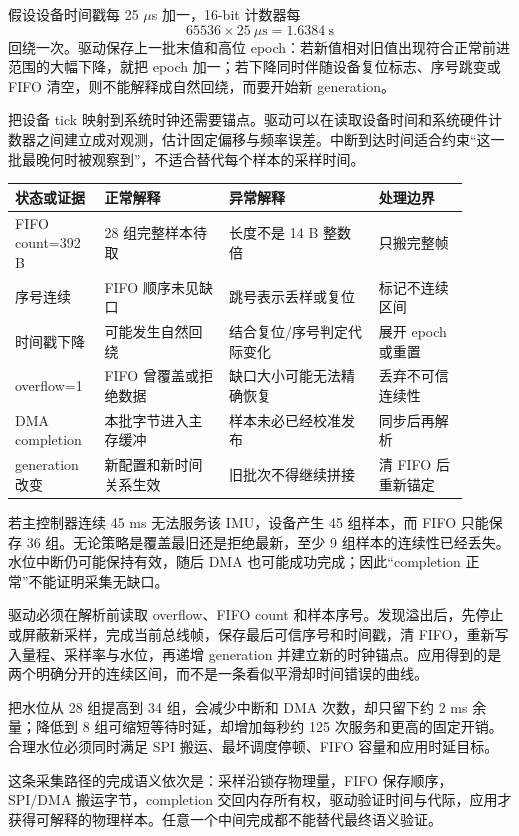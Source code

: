 
假设设备时间戳每 25 $\mu$s 加一，16-bit 计数器每
\[
65536\times25\ \mu\text{s}=1.6384\ \text{s}
\]
回绕一次。驱动保存上一批末值和高位 epoch：若新值相对旧值出现符合正常前进范围的大幅下降，就把 epoch 加一；若下降同时伴随设备复位标志、序号跳变或 FIFO 清空，则不能解释成自然回绕，而要开始新 generation。

把设备 tick 映射到系统时钟还需要锚点。驱动可以在读取设备时间和系统硬件计数器之间建立成对观测，估计固定偏移与频率误差。中断到达时间适合约束“这一批最晚何时被观察到”，不适合替代每个样本的采样时间。

\begin{longtable}{L{0.17\linewidth}L{0.25\linewidth}L{0.30\linewidth}L{0.18\linewidth}}
\toprule
状态或证据 & 正常解释 & 异常解释 & 处理边界 \\
\midrule
FIFO count=392 B & 28 组完整样本待取 & 长度不是 14 B 整数倍 & 只搬完整帧 \\\tablerowrule
序号连续 & FIFO 顺序未见缺口 & 跳号表示丢样或复位 & 标记不连续区间 \\\tablerowrule
时间戳下降 & 可能发生自然回绕 & 结合复位/序号判定代际变化 & 展开 epoch 或重置 \\\tablerowrule
overflow=1 & FIFO 曾覆盖或拒绝数据 & 缺口大小可能无法精确恢复 & 丢弃不可信连续性 \\\tablerowrule
DMA completion & 本批字节进入主存缓冲 & 样本未必已经校准发布 & 同步后再解析 \\\tablerowrule
generation 改变 & 新配置和新时间关系生效 & 旧批次不得继续拼接 & 清 FIFO 后重新锚定 \\
\bottomrule
\end{longtable}


若主控制器连续 45 ms 无法服务该 IMU，设备产生 45 组样本，而 FIFO 只能保存 36 组。无论策略是覆盖最旧还是拒绝最新，至少 9 组样本的连续性已经丢失。水位中断仍可能保持有效，随后 DMA 也可能成功完成；因此“completion 正常”不能证明采集无缺口。

驱动必须在解析前读取 overflow、FIFO count 和样本序号。发现溢出后，先停止或屏蔽新采样，完成当前总线帧，保存最后可信序号和时间戳，清 FIFO，重新写入量程、采样率与水位，再递增 generation 并建立新的时钟锚点。应用得到的是两个明确分开的连续区间，而不是一条看似平滑却时间错误的曲线。


把水位从 28 组提高到 34 组，会减少中断和 DMA 次数，却只留下约 2 ms 余量；降低到 8 组可缩短等待时延，却增加每秒约 125 次服务和更高的固定开销。合理水位必须同时满足 SPI 搬运、最坏调度停顿、FIFO 容量和应用时延目标。

这条采集路径的完成语义依次是：采样沿锁存物理量，FIFO 保存顺序，SPI/DMA 搬运字节，completion 交回内存所有权，驱动验证时间与代际，应用才获得可解释的物理样本。任意一个中间完成都不能替代最终语义验证。
